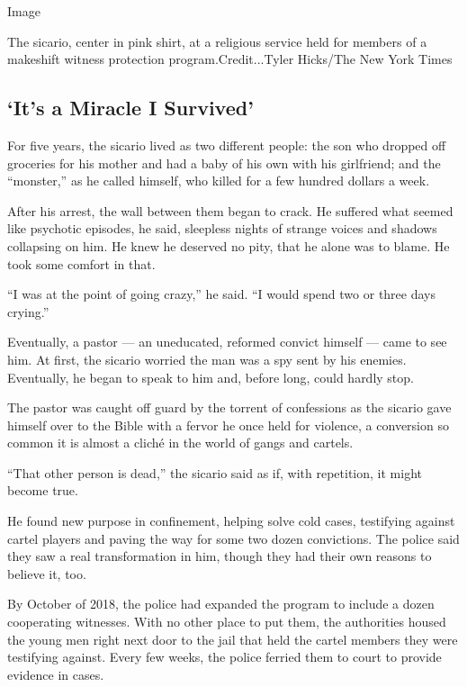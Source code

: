 Image

The sicario, center in pink shirt, at a religious service held for
members of a makeshift witness protection program.Credit...Tyler
Hicks/The New York Times

\hypertarget{its-a-miracle-i-survived}{%
\subsection{`It's a Miracle I
Survived'}\label{its-a-miracle-i-survived}}

For five years, the sicario lived as two different people: the son who
dropped off groceries for his mother and had a baby of his own with his
girlfriend; and the ``monster,'' as he called himself, who killed for a
few hundred dollars a week.

After his arrest, the wall between them began to crack. He suffered what
seemed like psychotic episodes, he said, sleepless nights of strange
voices and shadows collapsing on him. He knew he deserved no pity, that
he alone was to blame. He took some comfort in that.

``I was at the point of going crazy,'' he said. ``I would spend two or
three days crying.''

Eventually, a pastor --- an uneducated, reformed convict himself ---
came to see him. At first, the sicario worried the man was a spy sent by
his enemies. Eventually, he began to speak to him and, before long,
could hardly stop.

The pastor was caught off guard by the torrent of confessions as the
sicario gave himself over to the Bible with a fervor he once held for
violence, a conversion so common it is almost a cliché in the world of
gangs and cartels.

``That other person is dead,'' the sicario said as if, with repetition,
it might become true.

He found new purpose in confinement, helping solve cold cases,
testifying against cartel players and paving the way for some two dozen
convictions. The police said they saw a real transformation in him,
though they had their own reasons to believe it, too.

By October of 2018, the police had expanded the program to include a
dozen cooperating witnesses. With no other place to put them, the
authorities housed the young men right next door to the jail that held
the cartel members they were testifying against. Every few weeks, the
police ferried them to court to provide evidence in cases.

